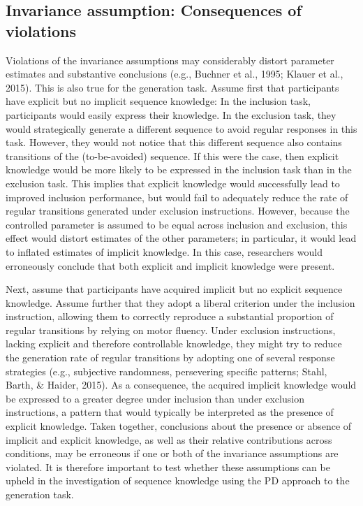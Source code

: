 \documentclass[floatsintext,man]{apa6}
\begin{document}
\subsection{Invariance assumption: Consequences of
violations}\label{invariance-assumption-consequences-of-violations}

Violations of the invariance assumptions may considerably distort
parameter estimates and substantive conclusions (e.g., Buchner et al.,
1995; Klauer et al., 2015). This is also true for the generation task.
Assume first that participants have explicit but no implicit sequence
knowledge: In the inclusion task, participants would easily express
their knowledge. In the exclusion task, they would strategically
generate a different sequence to avoid regular responses in this task.
However, they would not notice that this different sequence also
contains transitions of the (to-be-avoided) sequence. If this were the
case, then explicit knowledge would be more likely to be expressed in
the inclusion task than in the exclusion task. This implies that
explicit knowledge would successfully lead to improved inclusion
performance, but would fail to adequately reduce the rate of regular
transitions generated under exclusion instructions. However, because the
controlled parameter is assumed to be equal across inclusion and
exclusion, this effect would distort estimates of the other parameters;
in particular, it would lead to inflated estimates of implicit
knowledge. In this case, researchers would erroneously conclude that
both explicit and implicit knowledge were present.

Next, assume that participants have acquired implicit but no explicit
sequence knowledge. Assume further that they adopt a liberal criterion
under the inclusion instruction, allowing them to correctly reproduce a
substantial proportion of regular transitions by relying on motor
fluency. Under exclusion instructions, lacking explicit and therefore
controllable knowledge, they might try to reduce the generation rate of
regular transitions by adopting one of several response strategies
(e.g., subjective randomness, persevering specific patterns; Stahl,
Barth, \& Haider, 2015). As a consequence, the acquired implicit
knowledge would be expressed to a greater degree under inclusion than
under exclusion instructions, a pattern that would typically be
interpreted as the presence of explicit knowledge. Taken together,
conclusions about the presence or absence of implicit and explicit
knowledge, as well as their relative contributions across conditions,
may be erroneous if one or both of the invariance assumptions are
violated. It is therefore important to test whether these assumptions
can be upheld in the investigation of sequence knowledge using the PD
approach to the generation task.
\end{document}
